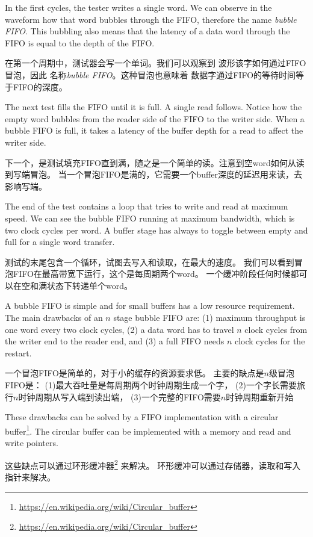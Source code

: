 \documentclass[%
    10pt,
    headinclude, footexclude,
    openright, %
    notitlepage,
    cleardoubleempty,
    headsepline,
    pointlessnumbers,
    bibtotoc, idxtotoc,
    ]{scrbook}
\newcommand{\myref}[2]{\href{#1}{#2}}
\renewcommand{\myref}[2]{{#2}{\footnote{\url{#1}}}}
\begin{document}
In the first cycles, the tester writes a single word. We can observe in
the waveform how that word bubbles through the FIFO, therefore the
name \emph{bubble FIFO}. This bubbling also means that the
latency of a data word through the FIFO is equal to the depth of the FIFO.

在第一个周期中，测试器会写一个单词。我们可以观察到
波形该字如何通过FIFO冒泡，因此
名称\emph{bubble FIFO}。这种冒泡也意味着
数据字通过FIFO的等待时间等于FIFO的深度。

The next test fills the FIFO until it is full. A single read follows.
Notice how the empty word bubbles from the reader side of the FIFO
to the writer side. When a bubble FIFO is full, it takes
a latency of the buffer depth for a read to affect the writer side. 

下一个，是测试填充FIFO直到满，随之是一个简单的读。注意到空word如何从读到写端冒泡。
当一个冒泡FIFO是满的，它需要一个buffer深度的延迟用来读，去影响写端。

The end of the test contains a loop that tries to write and read at maximum speed.
We can see the bubble FIFO running at maximum bandwidth, which is two
clock cycles per word. A buffer stage has always to toggle between empty
and full for a single word transfer.

测试的末尾包含一个循环，试图去写入和读取，在最大的速度。
我们可以看到冒泡FIFO在最高带宽下运行，这个是每周期两个word。
一个缓冲阶段任何时候都可以在空和满状态下转递单个word。

A bubble FIFO is simple and for small buffers has a low resource requirement.
The main drawbacks of an $n$ stage bubble FIFO are: (1) maximum throughput is
one word every two clock cycles, (2) a data word has to travel $n$ clock cycles
from the writer end to the reader end, and (3) a full FIFO needs $n$ clock cycles
for the restart.

一个冒泡FIFO是简单的，对于小的缓存的资源要求低。
主要的缺点是$n$级冒泡FIFO是：
(1)最大吞吐量是每周期两个时钟周期生成一个字，
(2)一个字长需要旅行$n$时钟周期从写入端到读出端，
(3)一个完整的FIFO需要$n$时钟周期重新开始

These drawbacks can be solved by a FIFO implementation with a
\myref{https://en.wikipedia.org/wiki/Circular_buffer}{circular buffer}.
The circular buffer can be implemented with a memory and
read and write pointers.

这些缺点可以通过\myref{https://en.wikipedia.org/wiki/Circular_buffer}{环形缓冲器}
来解决。
环形缓冲可以通过存储器，读取和写入指针来解决。
\end{document}
